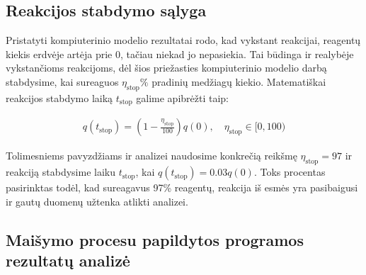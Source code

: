 
\subsection{Reakcijos stabdymo sąlyga}

Pristatyti kompiuterinio modelio rezultatai rodo, kad vykstant reakcijai, reagentų kiekis erdvėje artėja prie 0, tačiau niekad jo nepasiekia. Tai būdinga ir realybėje vykstančioms reakcijoms, dėl šios priežasties kompiuterinio modelio darbą stabdysime, kai sureaguos $\eta_\text{stop}\%$ pradinių medžiagų kiekio. Matematiškai reakcijos stabdymo laiką $t_\text{stop}$ galime apibrėžti taip:

\begin{align}
    q(t_\text{stop})=\left(1-\frac{\eta_\text{stop}}{100}\right)q(0),\quad \eta_\text{stop}\in[0, 100)
\end{align}

Tolimesniems pavyzdžiams ir analizei naudosime konkrečią reikšmę $\eta_\text{stop}=97$ ir reakciją stabdysime laiku $t_\text{stop}$, kai $q(t_\text{stop})=0.03q(0)$. Toks procentas pasirinktas todėl, kad sureagavus 97\% reagentų, reakcija iš esmės yra pasibaigusi ir gautų duomenų užtenka atlikti analizei.

\newpage
\subsection{Maišymo procesu papildytos programos rezultatų analizė}


